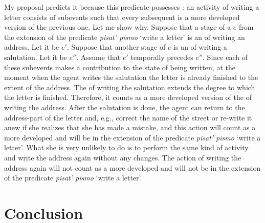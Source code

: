 \documentclass[output=paper,colorlinks,citecolor=brown,newtxmath]{langsci/langscibook}
\begin{document}
\z

\noindent My proposal predicts it because this predicate possesses : an activity of writing a letter consists of subevents such that every subsequent  is a more developed version of the previous one. Let me show why. Suppose that a stage of a  $e$ from the extension of the predicate \textit{pisat’ pismo} `write a letter' is an  of writing an address. Let it be $e'$. Suppose that another stage of $e$ is an  of writing a salutation. Let it be $e''$. Assume that $e'$ temporally precedes $e''$. Since each of these subevents makes a contribution to the state of being written, at the moment when the agent writes the salutation the letter is already finished to the extent of the address. The  of writing the salutation extends the degree to which the letter is finished. Therefore, it counts as a more developed version of the  of writing the address. After the salutation is done, the agent can return to the address-part of the letter and, e.g., correct the name of the street or re-write it anew if she realizes that she has made a mistake, and this action will count as a more developed  and will be in the extension of the predicate \textit{pisat’ pismo} `write a letter'. What she is very unlikely to do is to perform the same kind of activity and write the address again without any changes. The action of writing the address again will not count as a more developed  and will not be in the extension of the predicate \textit{pisat’ pismo} `write a letter'.

\section{Conclusion} \label{sec:naumov:4}
\end{document}
